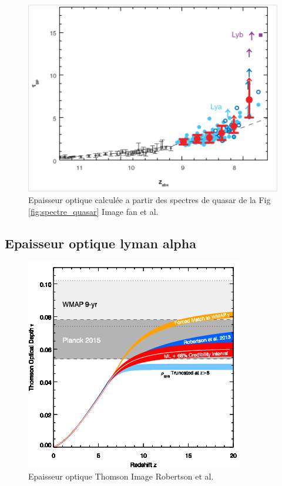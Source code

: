 \begin{figure}[bth]
        \includegraphics[width=.95\linewidth]{img/01/epaisseur_optique_quasar.png} 
        \caption{%
		Epaisseur optique calculée a partir des spectres de quasar de la Fig\,\ref{fig:spectre_quasar}
        Image fan et al.}
 		\label{fig:epaisseur_optique_quasar}
\end{figure}

\subsection{Epaisseur optique lyman alpha}

\begin{figure}[bth]
        \includegraphics[width=.95\linewidth]{img/01/epaisseur_optique_thomson.png} 
        \caption{%
		Epaisseur optique Thomson
        Image Robertson et al.}
 		\label{fig:epaisseur_optique_thomson}
\end{figure}



